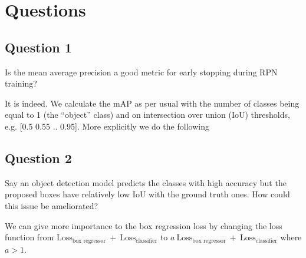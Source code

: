 \documentclass{article}
\begin{document}
\section{Questions}

\subsection{Question 1}
\begin{tcolorbox}
    Is the mean average precision a good metric for early stopping during RPN training?
\end{tcolorbox}
It is indeed. We calculate the mAP as per usual with the number of classes being equal to 1 (the “object” class) and on intersection over union (IoU) thresholds, e.g. [0.5 0.55 .. 0.95]. More explicitly we do the following
\begin{algorithm}
    \begin{algorithmic}[1]
        \Else
        \EndIf
        \EndFor
        \EndFor
    \end{algorithmic}
\end{algorithm}

\subsection{Question 2}
\begin{tcolorbox}
    Say an object detection model predicts the classes with high accuracy but the proposed boxes have relatively low IoU with the ground truth ones. How could this issue be ameliorated?
\end{tcolorbox}
We can give more importance to the box regression loss by changing the loss function
from \(\text{Loss}_\text{box regressor}\ +\ \text{Loss}_\text{classifier}\)
to \(a\ \text{Loss}_\text{box regressor}\ +\ \text{Loss}_\text{classifier}\)
where \(a > 1\).
\end{document}
